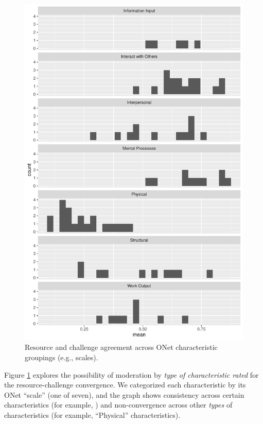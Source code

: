 \documentclass[
  man]{apa6}
\begin{document}
\begin{figure}
\centering
\includegraphics{Submission_ResourceCount_files/figure-latex/recchall-1.pdf}
\caption{\label{fig:recchall}Resource and challenge agreement across ONet characteristic groupings (e.g., scales).}
\end{figure}

Figure \ref{fig:recchall} explores the possibility of moderation by \emph{type of characteristic rated} for the resource-challenge convergence. We categorized each characteristic by its ONet ``scale'' (one of seven), and the graph shows consistency across certain characteristics (for example, ) and non-convergence across other \emph{types} of characteristics (for example, ``Physical'' characteristics).
\end{document}

